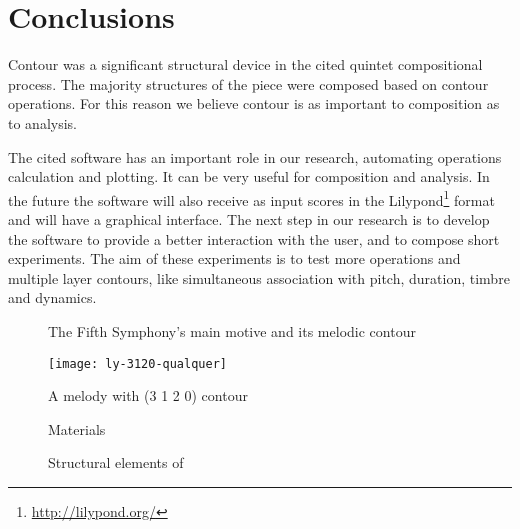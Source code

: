 \section{Conclusions}
\label{sec:conclusions}

Contour was a significant structural device in the cited quintet
compositional process. The majority structures of the piece were
composed based on contour operations. For this reason we believe
contour is as important to composition as to analysis.

The cited software has an important role in our research, automating
operations calculation and plotting. It can be very useful for
composition and analysis. In the future the software will also receive
as input scores in the Lilypond\footnote{\url{http://lilypond.org/}}
format and will have a graphical interface. The next step in our
research is to develop the software to provide a better interaction
with the user, and to compose short experiments. The aim of these
experiments is to test more operations and multiple layer contours,
like simultaneous association with pitch, duration, timbre and
dynamics.

\break

\begin{figure}[!p]
  \centering
  \subfloat[Contour (3 1 2 0)]{
    \texttt{[image: c-3120]}
    \label{fig:c-3120}
  }
  \caption{The Fifth Symphony's main motive and its melodic contour}
  \label{fig:5a-sinfonia}
\end{figure}

\begin{figure}
  \centering
  \texttt{[image: ly-3120-qualquer]}
  \caption{A melody with (3 1 2 0) contour}
  \label{fig:ly-3120}
\end{figure}

\begin{figure}[!p]
  \centering
  \subfloat[P(5 3 4 1 2 0) contour]{
    \texttt{[image: c-534120]}
    \label{fig:c-534120}
  }
  \caption{Materials}
  \label{fig:materials}
\end{figure}

\begin{figure}
  \centering

  \caption{Structural elements of }
  \label{fig:elementos-fugato}
\end{figure}

